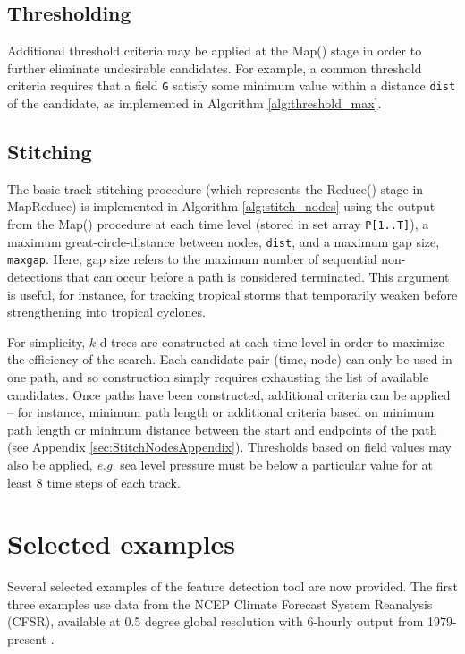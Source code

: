 \documentclass[gmdd, hvmath, online]{copernicus_discussions}
\begin{document}
\subsection{Thresholding}

Additional threshold criteria may be applied at the Map() stage in order to further eliminate undesirable candidates.  For example, a common threshold criteria requires that a field \texttt{G} satisfy some minimum value within a distance \texttt{dist} of the candidate, as implemented in Algorithm \ref{alg:threshold_max}.

\subsection{Stitching}

The basic track stitching procedure (which represents the Reduce() stage in MapReduce) is implemented in Algorithm \ref{alg:stitch_nodes} using the output from the Map() procedure at each time level (stored in set array \texttt{P[1..T]}), a maximum great-circle-distance between nodes, \texttt{dist}, and a maximum gap size, \texttt{maxgap}.  Here, gap size refers to the maximum number of sequential non-detections that can occur before a path is considered terminated.  This argument is useful, for instance, for tracking tropical storms that temporarily weaken before strengthening into tropical cyclones.

For simplicity, $k$-d trees are constructed at each time level in order to maximize the efficiency of the search.  Each candidate pair (time, node) can only be used in one path, and so construction simply requires exhausting the list of available candidates.  Once paths have been constructed, additional criteria can be applied -- for instance, minimum path length or additional criteria based on minimum path length or minimum distance between the start and endpoints of the path (see Appendix \ref{sec:StitchNodesAppendix}).  Thresholds based on field values may also be applied, \textit{e.g.} sea level pressure must be below a particular value for at least 8 time steps of each track.

\section{Selected examples}

Several selected examples of the feature detection tool are now provided.  The first three examples use data from the NCEP Climate Forecast System Reanalysis (CFSR), available at 0.5 degree global resolution with 6-hourly output from 1979-present \citep{saha2010ncep}.
\end{document}
